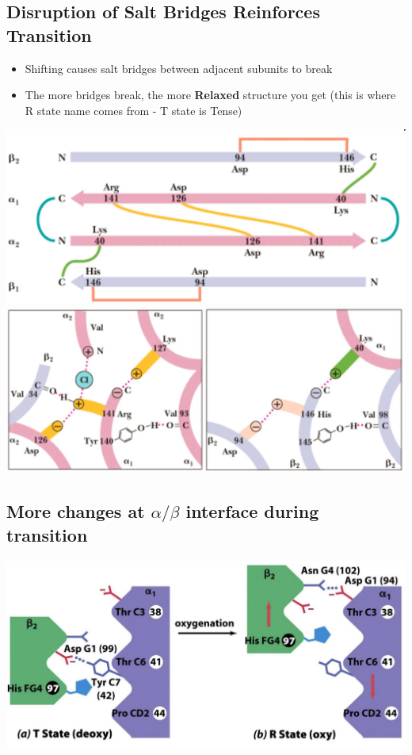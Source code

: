 \documentclass[10pt]{article}
\begin{document}
\subsection*{Disruption of Salt Bridges Reinforces Transition}
\begin{itemize}
    \item Shifting causes salt bridges between adjacent subunits to break
    \item The more bridges break, the more \textbf{Relaxed} structure you get (this is where R state name comes from - T state is Tense)
\end{itemize}
\begin{center}
    \includegraphics*[width=\textwidth]{L3_9.png}\\
    \includegraphics*[width=\textwidth]{L3_10.png}
\end{center}

\subsection*{More changes at $\alpha/\beta$ interface during transition}
\begin{center}
    \includegraphics*[width=\textwidth]{L3_11.png}
\end{center}
\end{document}
